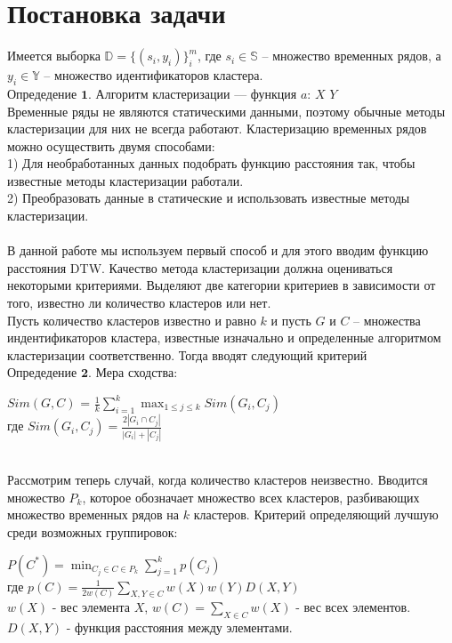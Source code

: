 \documentclass[12pt,twoside]{article}
\begin{document}
        \section{Постановка задачи}
        Имеется выборка $\mathbb{D} = \{(s_i, y_i)\}_i^m$, где $s_i \in \mathbb{S}$ – множество временных рядов, а  $y_i \in \mathbb{Y}$ – множество идентификаторов кластера. \\
        $\textbf{Опредедение 1}$. Алгоритм кластеризации — функция $a$: $X$ \arrow  $ Y$ \\
        Временные ряды не являются статическими данными, поэтому обычные методы кластеризации для них не всегда работают. Кластеризацию временных рядов можно осуществить двумя способами:\\
        1)  Для необработанных данных подобрать функцию расстояния так, чтобы известные методы кластеризации работали. \\
        2) Преобразовать данные в статические и использовать известные методы кластеризации. \\
        \\
        В данной работе мы используем первый способ и для этого вводим функцию расстояния DTW. 
        Качество метода кластеризации должна оцениваться некоторыми критериями. Выделяют две категории критериев в зависимости от того, известно ли количество кластеров или нет. \\
        Пусть количество кластеров известно и равно $k$ и пусть $G$ и $C$ – множества индентификаторов кластера, известные изначально и определенные алгоритмом кластеризации соответственно. Тогда вводят следующий критерий \\
        $\textbf{Опредедение 2}$. Мера сходства: \\
        \begin{center}
            $Sim(G,C)$ = $\frac{1}{k}\sum\limits_{i=1}^k\max_{1 \leq j \leq k} Sim(G_i, C_j)$\\ где $Sim(G_i, C_j) =\frac{2|G_i\cap C_j|}{|G_i| + |C_j|} $
        \end{center} \\
        Рассмотрим теперь случай,  когда количество кластеров неизвестно. Вводится множество $P_k$, которое обозначает множество всех кластеров, разбивающих множество временных рядов на $k$ кластеров. Критерий определяющий лучшую среди возможных группировок: \\
        \begin{center}
            $P(C^*) = \min_{C_j \in C \in P_k}\sum\limits_{j=1}^k p(C_j)$ \\
            где $p(C) = \frac{1}{2w(C)}\sum\limits_{X,Y\in C} w(X)w(Y)D(X,Y)$\\
            $w(X)$ - вес элемента $X$, $w(C) = \sum\limits_{X\in C} w(X)$ - вес всех элементов. \\
            $D(X,Y)$ - функция расстояния между элементами.
        \end{center} \\
\end{document}
